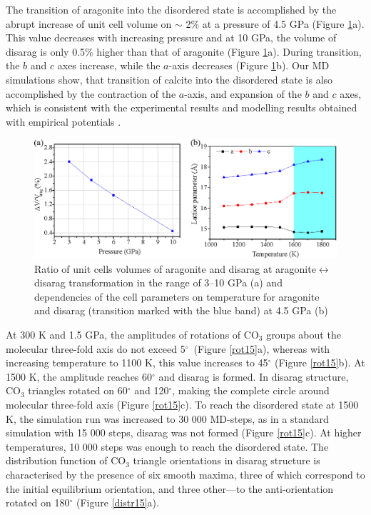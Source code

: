 \documentclass[journal=jacsat,manuscript=article]{achemso}
\begin{document}
The transition of aragonite into the disordered state is accomplished by the abrupt increase of unit cell volume on $\sim$ 2\% at a pressure of 4.5 GPa (Figure \ref{arag_cell}a).
This value decreases with increasing pressure and at 10 GPa, the volume of disarag is only 0.5\% higher than that of aragonite (Figure \ref{arag_cell}a). 
During transition, the $b$ and $c$ axes increase, while the $a$-axis decreases (Figure \ref{arag_cell}b). 
Our MD simulations show, that transition of calcite into the disordered state is also accomplished by the contraction of the $a$-axis, and expansion of the $b$ and $c$ axes, which is consistent with the experimental results \cite{antao2009} and modelling results obtained with empirical potentials \cite{kawano2009}.

\begin{figure}[H]
\includegraphics[width=\textwidth]{arag_cell} \centering
\caption{ Ratio of unit cells volumes of aragonite and disarag at aragonite$\leftrightarrow$disarag transformation in the range of 3--10 GPa (a) and dependencies of the cell parameters on temperature for aragonite and disarag (transition marked with the blue band) at 4.5 GPa (b) } \label{arag_cell}
\end{figure}


At 300 K and 1.5 GPa, the amplitudes of rotations of CO$_3$ groups about the molecular three-fold axis do not exceed 5$^{\circ}$\ (Figure \ref{rot15}a), whereas with increasing temperature to 1100 K, this value increases to 45$^{\circ}$ (Figure \ref{rot15}b). 
At 1500 K, the amplitude reaches 60$^{\circ}$ and disarag is formed. 
In disarag structure, CO$_3$ triangles rotated on 60$^{\circ}$ and 120$^{\circ}$, making the complete circle around molecular three-fold axis (Figure \ref{rot15}c). 
To reach the disordered state at 1500 K, the simulation run was increased to 30 000 MD-steps, as in a standard simulation with 15 000 steps, disarag was not formed (Figure \ref{rot15}c).
At higher temperatures, 10 000 steps was enough to reach the disordered state.
The distribution function of CO$_3$ triangle orientations in disarag structure is characterised by the presence of six smooth maxima, three of which correspond to the initial equilibrium orientation, and three other---to the anti-orientation rotated on 180$^{\circ}$ (Figure  \ref{distr15}a).
\end{document}
